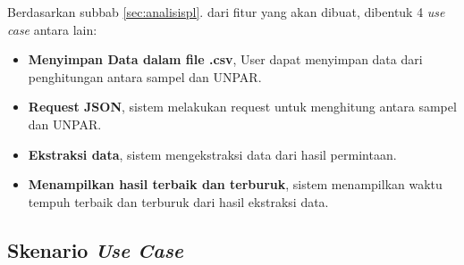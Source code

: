 Berdasarkan subbab \ref{sec:analisispl}. dari fitur yang akan dibuat, dibentuk 4 \textit{use case} antara lain:
\begin{itemize}
\item \textbf{Menyimpan Data dalam file .csv}, User dapat menyimpan data dari penghitungan antara sampel dan UNPAR.
\item \textbf{Request JSON}, sistem melakukan request untuk menghitung antara sampel dan UNPAR.
\item \textbf{Ekstraksi data}, sistem mengekstraksi data dari hasil permintaan.
\item \textbf{Menampilkan hasil terbaik dan terburuk}, sistem menampilkan waktu tempuh terbaik dan terburuk dari hasil ekstraksi data.
\end{itemize}

\subsection{Skenario \textit{Use Case}}
\label{subsec:skenariousecase}

